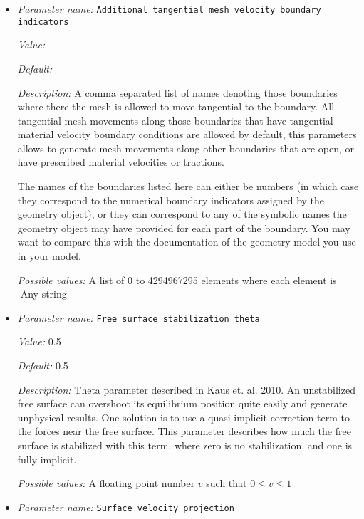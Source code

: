 \begin{itemize}
\item {\it Parameter name:} {\tt Additional tangential mesh velocity boundary indicators}
\label{parameters:Free surface/Additional tangential mesh velocity boundary indicators}


{\it Value:} 


{\it Default:} 


{\it Description:} A comma separated list of names denoting those boundaries where there the mesh is allowed to move tangential to the boundary. All tangential mesh movements along those boundaries that have tangential material velocity boundary conditions are allowed by default, this parameters allows to generate mesh movements along other boundaries that are open, or have prescribed material velocities or tractions.

The names of the boundaries listed here can either be numbers (in which case they correspond to the numerical boundary indicators assigned by the geometry object), or they can correspond to any of the symbolic names the geometry object may have provided for each part of the boundary. You may want to compare this with the documentation of the geometry model you use in your model.


{\it Possible values:} A list of 0 to 4294967295 elements where each element is [Any string]
\item {\it Parameter name:} {\tt Free surface stabilization theta}
\label{parameters:Free surface/Free surface stabilization theta}


{\it Value:} 0.5


{\it Default:} 0.5


{\it Description:} Theta parameter described in Kaus et. al. 2010. An unstabilized free surface can overshoot its equilibrium position quite easily and generate unphysical results.  One solution is to use a quasi-implicit correction term to the forces near the free surface.  This parameter describes how much the free surface is stabilized with this term, where zero is no stabilization, and one is fully implicit.


{\it Possible values:} A floating point number $v$ such that $0 \leq v \leq 1$
\item {\it Parameter name:} {\tt Surface velocity projection}
\label{parameters:Free surface/Surface velocity projection}



\end{itemize}
